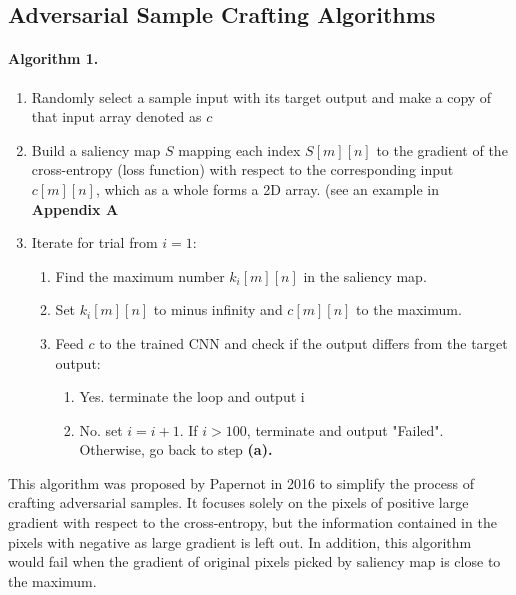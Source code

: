 \documentclass{article}
\begin{document}
\subsection{Adversarial Sample Crafting Algorithms}
\paragraph{Algorithm 1.}
\begin{enumerate}

\item Randomly select a sample input with its target output and make a copy of that input array denoted as $c$

\item Build a saliency map $S$ mapping each index $S[m][n]$ to the gradient of the cross-entropy (loss function) with respect to the corresponding input $c[m][n]$, which as a whole forms a 2D array. (see an example in \textbf{Appendix A}

\item Iterate for trial from $i=1$:

\begin{enumerate}
	\item Find the maximum number $k_i[m][n]$ in the saliency map.

	\item Set $k_i[m][n]$ to minus infinity  and $c[m][n]$ to the maximum.

	\item Feed $c$ to the trained CNN and check if the output differs from the target output:
		\begin{enumerate}
			\item Yes. terminate the loop and output i
			\item No. set $i=i+1$. If $i > 100$, terminate and output "Failed". Otherwise, go back to step \textbf{(a).}
		\end{enumerate}
\end{enumerate}
\end{enumerate}

This algorithm was proposed by Papernot\cite{Papernot} in 2016 to simplify the process of crafting adversarial samples. It focuses solely on the pixels of positive large gradient with respect to the cross-entropy, but the information contained in the pixels with negative as large gradient is left out.
In addition, this algorithm would fail when the gradient of original pixels picked by saliency map is close to the maximum.\cite{Papernot2}
\end{document}
